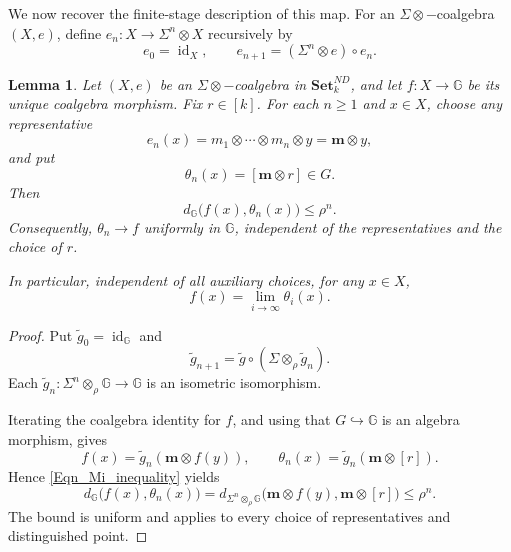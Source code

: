 \documentclass{sn-jnl}%
\theoremstyle{thmstyleone}%
\newtheorem{lemma}[theorem]{Lemma}%
\theoremstyle{thmstyletwo}%
\theoremstyle{thmstylethree}%
\newcommand{\setnd}{\mathbf{Set}_{k}^{ND}}
\newcommand{\M}{\Sigma}
\newcommand{\F}{\M\otimes}
\newcommand{\Fw}{\M\otimes_{\w}}
\newcommand{\Fwi}[1]{\M^{#1}\otimes_{\w}}
\newcommand{\Fi}[1]{\M^{#1}\otimes }
\newcommand{\G}{\mathbb{G}}
\newcommand{\w}{\rho}
\begin{document}
We now recover the finite-stage description of this map. For an $\F-$coalgebra $(X,e)$, define $e_n:X\to\Fi{n}X$ recursively by
\begin{equation} 
\nonumber
    e_0=\operatorname{id}_X, \qquad e_{n+1}=(\Fi{n}e)\circ e_n.
\end{equation}

\begin{lemma}
\label{Lem_MediatingMapApproximation}
    Let $(X,e)$ be an $\F-$coalgebra in $\setnd$, and let $f:X\to\G$ be its unique coalgebra morphism. Fix $r\in[k]$. For each $n\geq1$ and $x\in X$, choose any representative
    \begin{equation} 
    \nonumber
        e_n(x)=m_1\otimes\cdots\otimes m_n\otimes y = \mathbf m\otimes y,
    \end{equation}
    and put
    \begin{equation} 
    \nonumber
        \theta_n(x)=[\mathbf m\otimes r]\in G.
    \end{equation}
    Then
    \begin{equation} 
    \nonumber
        d_\G\bigl(f(x),\theta_n(x)\bigr)\leq\w^n.
    \end{equation}
    Consequently, $\theta_n\to f$ uniformly in $\G$, independent of the representatives and the choice of $r$. 
    
    In particular, independent of all auxiliary choices, for any $x\in X$,
    \begin{equation} 
    \nonumber
        f(x)=\lim_{i\rightarrow \infty}\theta_i(x).
    \end{equation}
\end{lemma}

\begin{proof}
Put $\tilde g_0=\operatorname{id}_\G$ and
\begin{equation} 
\nonumber
    \tilde g_{n+1}=\tilde g\circ(\Fw\tilde g_n).
\end{equation}
Each $\tilde g_n:\Fwi{n}\G\to\G$ is an isometric isomorphism.

Iterating the coalgebra identity for $f$, and using that $G\hookrightarrow\G$ is an algebra morphism, gives
\begin{equation} 
\nonumber
    f(x)=\tilde g_n(\mathbf m\otimes f(y)), \qquad \theta_n(x)=\tilde g_n(\mathbf m\otimes[r]).
\end{equation}
Hence \eqref{Eqn_Mi_inequality} yields
\begin{equation} 
\nonumber
    d_\G\bigl(f(x),\theta_n(x)\bigr) = d_{\Fwi{n}\G} \bigl(\mathbf m\otimes f(y), \mathbf m\otimes[r]\bigr) \leq\w^n.
\end{equation}
The bound is uniform and applies to every choice of representatives and distinguished point.
\end{proof}
\end{document}
